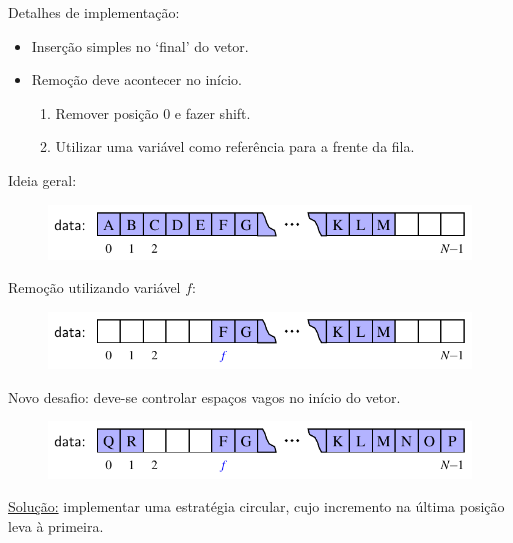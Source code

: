 \medskip

Detalhes de implementação:
\begin{itemize}
	\item Inserção simples no `final' do vetor.
	\item Remoção deve acontecer no início.
	\begin{enumerate}
		\item Remover posição 0 e fazer shift. 
		\item Utilizar uma variável como referência para a frente da fila. 
	\end{enumerate}
\end{itemize}

\medskip

Ideia geral:
\begin{figure}[H]
	\centering
	\includegraphics[width=0.7\linewidth]{img/figure-6-5}
\end{figure}

Remoção utilizando variável $f$:
\begin{figure}[H]
	\centering
	\includegraphics[width=0.7\linewidth]{img/figure-6-6}
\end{figure}

\medskip

Novo desafio: deve-se controlar espaços vagos no início do vetor.

\begin{figure}[H]
	\centering
	\includegraphics[width=0.7\linewidth]{img/figure-6-7}
\end{figure}

\underline{Solução:} implementar uma estratégia circular, cujo incremento na última posição leva à primeira.

\medskip

